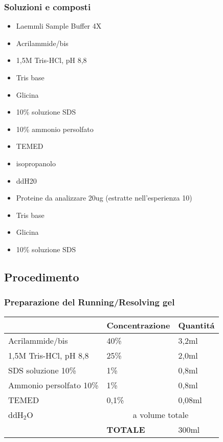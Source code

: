 \subsubsection{Soluzioni e composti}

\begin{itemize}
\item Laemmli Sample Buffer 4X
\item Acrilammide/bis
\item 1,5M Tris-HCl, pH 8,8
\item Tris base
\item Glicina
\item 10\% soluzione SDS
\item 10\% ammonio persolfato
\item TEMED
\item isopropanolo
\item ddH20
\item Proteine da analizzare 20ug (estratte nell'esperienza 10)
\item Tris base
\item Glicina
\item 10\% soluzione SDS
\end{itemize}


\subsection{Procedimento}

\subsubsection{Preparazione del Running/Resolving gel}

\begin{tabular}{|l|l|l|} \hline
	& \textbf{Concentrazione} & \textbf{Quantit\'a} \\\hline
	Acrilammide/bis & 40\% & 3,2ml \\\hline
	1,5M Tris-HCl, pH 8,8 & 25\% & 2,0ml \\\hline
	SDS soluzione 10\% & 1\% & 0,8ml \\\hline
	Ammonio persolfato 10\% & 1\% & 0,8ml \\\hline
	TEMED & 0,1\% & 0,08ml \\\hline
	ddH$_2$O & \multicolumn{2}{c|}{a volume totale} \\\hline

	& \textbf{TOTALE} & 300ml \\\hline
\end{tabular}

